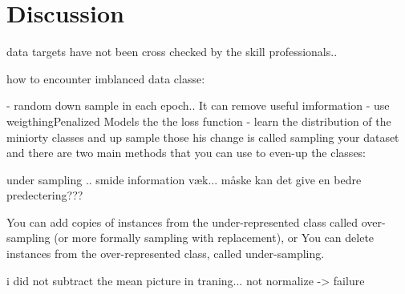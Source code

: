 \section{Discussion}
\label{sec:discussion}



data targets have not been cross checked by the skill professionals..


how to encounter imblanced data classe:

-  random down sample in each epoch.. It can remove useful imformation
- use weigthingPenalized Models the the loss function
- learn the distribution of the miniorty classes and up sample those
his change is called sampling your dataset and there are two main methods that you can use to even-up the classes:



under sampling .. smide information væk... måske kan det give en bedre predectering???




You can add copies of instances from the under-represented class called over-sampling (or more formally sampling with replacement), or
You can delete instances from the over-represented class, called under-sampling.



i did not subtract the mean picture in traning... not normalize -> failure